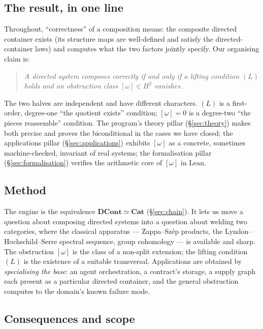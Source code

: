 \documentclass[11pt]{article}
\theoremstyle{plain}
\theoremstyle{definition}
\theoremstyle{remark}
\newcommand{\DCont}{\mathbf{DCont}}
\newcommand{\Cat}{\mathbf{Cat}}
\newcommand{\omegacl}{[\omega]}
\newcommand{\HH}[1]{H^{#1}}
\begin{document}
\subsection{The result, in one line}

Throughout, ``correctness'' of a composition means: the composite directed container
exists (its structure maps are well-defined and satisfy the directed-container laws) and
computes what the two factors jointly specify. Our organising claim is:

\begin{quote}
\emph{A directed system composes correctly if and only if a lifting condition $(L)$ holds
and an obstruction class $\omegacl \in \HH{2}$ vanishes.}
\end{quote}

The two halves are independent and have different characters. $(L)$ is a first-order,
degree-one ``the quotient exists'' condition; $\omegacl=0$ is a degree-two ``the pieces
reassemble'' condition. The program's theory pillar (\S\ref{sec:theory}) makes both
precise and proves the biconditional in the cases we have closed; the applications pillar
(\S\ref{sec:applications}) exhibits $\omegacl$ as a concrete, sometimes machine-checked,
invariant of real systems; the formalisation pillar (\S\ref{sec:formalisation}) verifies
the arithmetic core of $\omegacl$ in Lean.

\subsection{Method}

The engine is the equivalence $\DCont \simeq \Cat$ (\S\ref{sec:chain}). It lets us move a
question about composing directed systems into a question about welding two categories,
where the classical apparatus --- Zappa--Sz\'ep products, the Lyndon--Hochschild--Serre
spectral sequence, group cohomology --- is available and sharp. The obstruction $\omegacl$
is the class of a non-split extension; the lifting condition $(L)$ is the existence of a
suitable transversal. Applications are obtained by \emph{specialising the base}: an agent
orchestration, a contract's storage, a supply graph each present as a particular directed
container, and the general obstruction computes to the domain's known failure mode.

\subsection{Consequences and scope}
\end{document}
